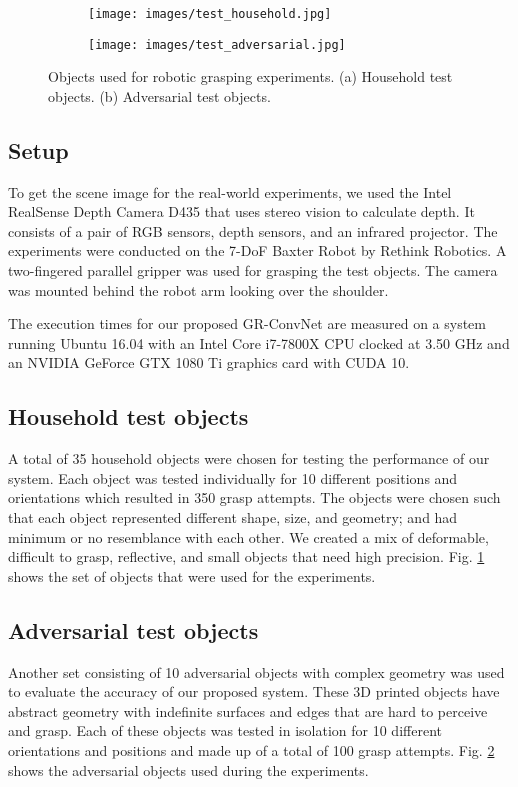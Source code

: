 \documentclass[letterpaper, 10 pt, conference]{ieeeconf}
\begin{document}
\begin{figure}
\vspace*{0.1cm}
\begin{subfigure}{.24\textwidth}
  \centering
  \texttt{[image: images/test\_household.jpg]}  
  \caption{}
  \label{fig:household_objects}
\end{subfigure}
\begin{subfigure}{.24\textwidth}
  \centering
  \texttt{[image: images/test\_adversarial.jpg]}  
  \caption{}
  \label{fig:adversarial_objects}
\end{subfigure}
\caption{Objects used for robotic grasping experiments. (a) Household test objects. (b) Adversarial test objects.}
\label{fig:test_objects}
\end{figure}

\subsection{Setup}
To get the scene image for the real-world experiments, we used the Intel RealSense Depth Camera D435 that uses stereo vision to calculate depth. It consists of a pair of RGB sensors, depth sensors, and an infrared projector. The experiments were conducted on the 7-DoF Baxter Robot by Rethink Robotics. A two-fingered parallel gripper was used for grasping the test objects. The camera was mounted behind the robot arm looking over the shoulder.

The execution times for our proposed GR-ConvNet are measured on a system running Ubuntu 16.04 with an Intel Core i7-7800X CPU clocked at 3.50 GHz and an NVIDIA GeForce GTX 1080 Ti graphics card with CUDA 10.

\subsection{Household test objects}
A total of 35 household objects were chosen for testing the performance of our system. Each object was tested individually for 10 different positions and orientations which resulted in 350 grasp attempts. The objects were chosen such that each object represented different shape, size, and geometry; and had minimum or no resemblance with each other. We created a mix of deformable, difficult to grasp, reflective, and small objects that need high precision. Fig. \ref{fig:household_objects} shows the set of objects that were used for the experiments.

\subsection{Adversarial test objects}
Another set consisting of 10 adversarial objects with complex geometry was used to evaluate the accuracy of our proposed system. These 3D printed objects have abstract geometry with indefinite surfaces and edges that are hard to perceive and grasp. Each of these objects was tested in isolation for 10 different orientations and positions and made up of a total of 100 grasp attempts. Fig. \ref{fig:adversarial_objects} shows the adversarial objects used during the experiments.
\end{document}

